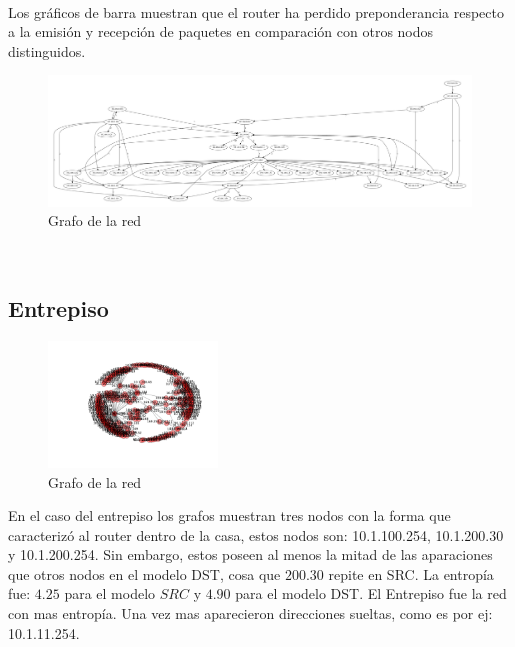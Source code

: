 ~

Los gráficos de barra muestran que el router ha perdido preponderancia respecto a la emisión y recepción de paquetes en comparación con otros nodos distinguidos.

\begin{figure}
\vspace{-35pt}
\hspace{-35pt}
\centering
   \includegraphics[width=1\textwidth]{resultados/empresa/conectividad.pdf}
\vspace{-30pt}
   \caption{Grafo de la red}
\end{figure}

~

\subsection{Entrepiso}

\begin{figure}
\vspace{-35pt}
\hspace{-35pt}
\centering
   \includegraphics[width=0.4\textwidth]{resultados/entrepiso/conectividadNX.pdf}
\vspace{-30pt}
   \caption{Grafo de la red}
\end{figure}

En el caso del entrepiso los grafos muestran tres nodos con la forma que caracteriz\'o 
al router dentro de la casa, estos nodos son: 10.1.100.254, 10.1.200.30 y 10.1.200.254.
Sin embargo, estos poseen al menos la mitad de las aparaciones que otros nodos en 
el modelo DST, cosa que $200.30$ repite en SRC. La entrop\'ia fue: $4.25$ para el
modelo $SRC$ y $4.90$ para el modelo DST. El Entrepiso fue la red con mas entrop\'ia.
Una vez mas aparecieron direcciones sueltas, como es por ej: 10.1.11.254.


